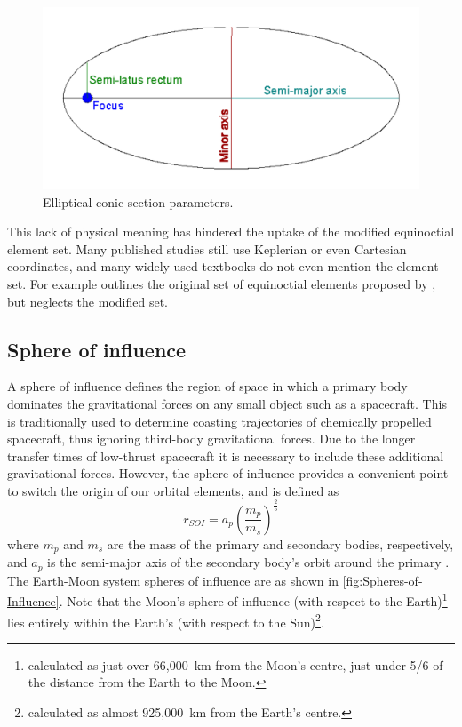 \begin{figure}[h]
\begin{center}
\includegraphics[scale=0.35]{Images/ellipse_parameters.pdf}
\end{center}
\caption{Elliptical conic section parameters.}
\label{fig:Elliptical-Conic-Section}
\end{figure}

This lack of physical meaning has hindered the uptake of the modified equinoctial element set. Many published studies still use Keplerian or even Cartesian coordinates, and many widely used textbooks do not even mention the element set. For example \textcite[][p. 194]{Chobotov2002} outlines the original set of equinoctial elements proposed by \textcite{Broucke1972}, but neglects the modified set.

\subsection{Sphere of influence}\label{sub:SOI}
A sphere of influence defines the region of space in which a primary body dominates the gravitational forces on any small object such as a spacecraft. This is traditionally used to determine coasting trajectories of chemically propelled spacecraft, thus ignoring third-body gravitational forces. Due to the longer transfer times of low-thrust spacecraft it is necessary to include these additional gravitational forces. However, the sphere of influence provides a convenient point to switch the origin of our orbital elements, and is defined as
\begin{equation}
r_{SOI}=a_{p}\left(\frac{m_{p}}{m_{s}}\right)^{\frac{2}{5}} \label{eq:SOI}
\end{equation}
where $m_{p}$ and $m_{s}$ are the mass of the primary and secondary bodies, respectively, and $a_{p}$ is the semi-major axis of the secondary body's orbit around the primary \parencite{Kemble2006}. The Earth-Moon system spheres of influence are as shown in \autoref{fig:Spheres-of-Influence}.
 Note that the Moon's sphere of influence (with respect to the Earth)\footnote{calculated as just over 66,000~km from the Moon's centre, just under 5/6 of the distance from the Earth to the Moon.} lies entirely within the Earth's (with respect to the Sun)\footnote{calculated as almost 925,000~km from the Earth's centre.}.

